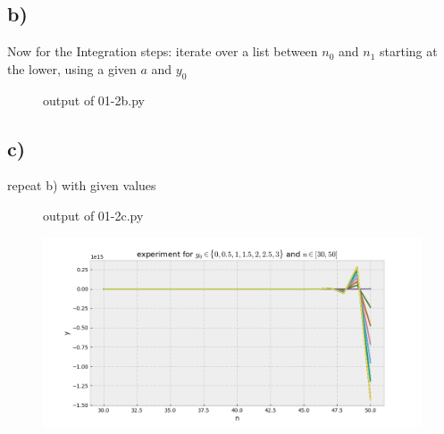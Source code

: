 \documentclass[11pt, a4paper, reqno]{scrartcl}
\begin{document}
    \newpage
    \subsection*{b)}
    Now for the Integration steps: iterate over a list between $n_0$ and $n_1$ starting at the lower, using a given $a$ and $y_0$  
    
    \begin{figure}[H]
        \centering
            
        \caption{output of 01-2b.py}
    \end{figure}

    \newpage
    \subsection*{c)}
    repeat b) with given values
    
    
    
    \begin{figure}[H]
        \centering
        
        \caption{output of 01-2c.py}
    \end{figure}

    \begin{figure}[H]
        \centering
        \includegraphics[width=.8\paperwidth]{01-2c}
    \end{figure}
    
    
    
\end{document}
